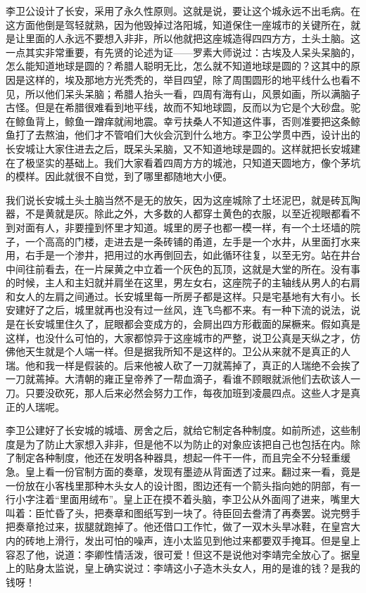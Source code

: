 李卫公设计了长安，采用了永久性原则。这就是说，要让这个城永远不出毛病。在这方面他倒是驾轻就熟，因为他毁掉过洛阳城，知道保住一座城市的关键所在，就是让里面的人永远不要想入非非，所以他就把这座城造得四四方方，土头土脑。这一点其实非常重要，有先贤的论述为证——罗素大师说过：古埃及人呆头呆脑的，怎么能知道地球是圆的？希腊人聪明无比，怎么就不知道地球是圆的？这其中的原因是这样的，埃及那地方光秃秃的，举目四望，除了周围圆形的地平线什么也看不见，所以他们呆头呆脑；希腊人抬头一看，四周有海有山，风景如画，所以满脑子古怪。但是在希腊很难看到地平线，故而不知地球圆，反而以为它是个大砂盘。驼在鲸鱼背上，鲸鱼一蹭痒就闹地震。幸亏扶桑人不知道这件事，否则准要把这条鲸鱼打了去熬油，他们才不管咱们大伙会沉到什么地方。李卫公学贯中西，设计出的长安城让大家住进去之后，既呆头呆脑，又不知道地球是圆的。这样就把长安城建在了极坚实的基础上。我们大家看着四周方方的城池，只知道天圆地方，像个茅坑的模样。因此就很不自觉，到了哪里都随地大小便。 

我们说长安城土头土脑当然不是无的放矢，因为这座城除了土坯泥巴，就是砖瓦陶器，不是黄就是灰。除此之外，大多数的人都穿土黄色的衣服，以至近视眼都看不到对面有人，非要撞到怀里才知道。城里的房子也都一模一样，有一个土坯墙的院子，一个高高的门楼，走进去是一条砖铺的甬道，左手是一个水井，从里面打水来用，右手是一个渗井，把用过的水再倒回去，如此循环往复，以至无穷。站在井台中间往前看去，在一片屎黄之中立着一个灰色的瓦顶，这就是大堂的所在。没有事的时候，主人和主妇就并肩坐在这里，男左女右，这座院子的主轴线从男人的右肩和女人的左肩之间通过。长安城里每一所房子都是这样。只是宅基地有大有小。长安建好了之后，城里就再也没有过一丝风，连飞鸟都不来。有一种下流的说法，说是在长安城里住久了，屁眼都会变成方的，会屙出四方形截面的屎橛来。假如真是这样，也没什么可怕的，大家都惊异于这座城市的严整，说卫公真是天纵之才，仿佛他天生就是个人端一样。但是据我所知不是这样的。卫公从来就不是真正的人瑞。他和我一样是假装的。后来他被人砍了一刀就蔫掉了，真正的人瑞绝不会挨了一刀就蔫掉。大清朝的雍正皇帝养了一帮血滴子，看谁不顾眼就派他们去砍该人一刀。只要没砍死，那人后来必然会努力工作，每夜加班到凌晨四点。这些人才是真正的人瑞呢。 

李卫公建好了长安城的城墙、房舍之后，就给它制定各种制度。如前所述，这些制度是为了防止大家想入非非，但是他不以为防止的对象应该把自己也包括在内。除了制定各种制度，他还在发明各种器具，想起一件干一件，而且完全不分轻重缓急。皇上看一份官制方面的奏章，发现有墨迹从背面透了过来。翻过来一看，竟是一份放在小客栈里那种木头女人的设计图，图边还有一个箭头指向她的阴部，有一行小字注着“里面用绒布”。皇上正在摸不着头脑，李卫公从外面闯了进来，嘴里大叫着：臣忙昏了头，把奏章和图纸写到一块了。待臣回去誊清了再奏罢。说完劈手把奏章抢过来，拔腿就跑掉了。他还借口工作忙，做了一双木头旱冰鞋，在皇宫大内的砖地上滑行，发出可怕的噪声，连小太监见到他过来都要双手掩耳。但是皇上容忍了他，说道：李卿性情活泼，很可爱！但这不是说他对李靖完全放心了。据皇上的贴身太监说，皇上确实说过：李靖这小子造木头女人，用的是谁的钱？是我的钱呀！ 

